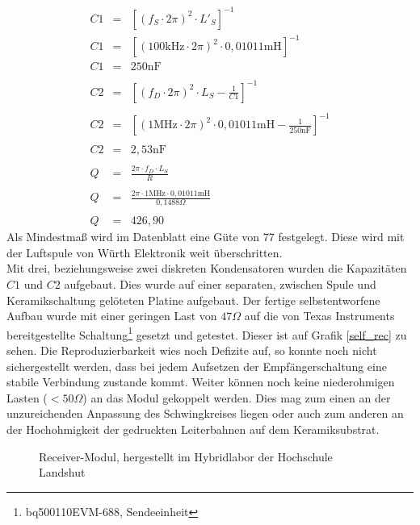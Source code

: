 \documentclass[12pt]{scrreprt} %
\begin{document}
\begin{eqnarray}
C1&=&\left[\left(f_S \cdot 2\pi\right)^2 \cdot L'_S\right]^{-1}\\
C1&=&\left[\left(100\text{kHz} \cdot 2\pi\right)^2 \cdot 0,01011\text{mH}\right]^{-1}\\
C1&=&250\text{nF}\\
\nonumber\\
C2&=&\left[\left(f_D \cdot 2\pi\right)^2 \cdot L_S-\frac 1{C1}\right]^{-1}\\
\nonumber\\
C2&=&\left[\left(1\text{MHz} \cdot 2\pi\right)^2 \cdot 0,01011\text{mH}-\frac 1{250\text{nF}}\right]^{-1}\\
\nonumber\\
C2&=&2,53\text{nF}\\
\nonumber\\
Q&=&\frac{2\pi \cdot f_D \cdot L_S}{R}\\
\nonumber\\
Q&=&\frac{2\pi \cdot 1\text{MHz} \cdot 0,01011\text{mH}}{0,1488 \Omega}\\
\nonumber\\
Q&=&426,90
\end{eqnarray}
Als Mindestmaß wird im Datenblatt \citep[siehe S.23]{BQ51013} eine Güte von 77 festgelegt. Diese wird mit der Luftspule von Würth Elektronik weit überschritten.\\
Mit drei, beziehungsweise zwei diskreten Kondensatoren wurden die Kapazitäten $C1$ und $C2$ aufgebaut. Dies wurde auf einer separaten, zwischen Spule und Keramikschaltung gelöteten Platine aufgebaut. Der fertige selbstentworfene Aufbau wurde mit einer geringen Last von $47 \Omega$ auf die von Texas Instruments bereitgestellte Schaltung\footnote{bq500110EVM-688, Sendeeinheit} gesetzt und getestet. Dieser ist auf Grafik \vref{self_rec} zu sehen. Die Reproduzierbarkeit wies noch Defizite auf, so konnte noch nicht sichergestellt werden, dass bei jedem Aufsetzen der Empfängerschaltung eine stabile Verbindung zustande kommt. Weiter können noch keine niederohmigen Lasten ($<50 \Omega$) an das Modul gekoppelt werden. Dies mag zum einen an der unzureichenden Anpassung des Schwingkreises liegen oder auch zum anderen an der Hochohmigkeit der gedruckten Leiterbahnen auf dem Keramiksubstrat. 
\begin{figure}
\centering
{}
\caption{Receiver-Modul, hergestellt im Hybridlabor der Hochschule Landshut}
\label{self_rec}
\end{figure}
\end{document}
